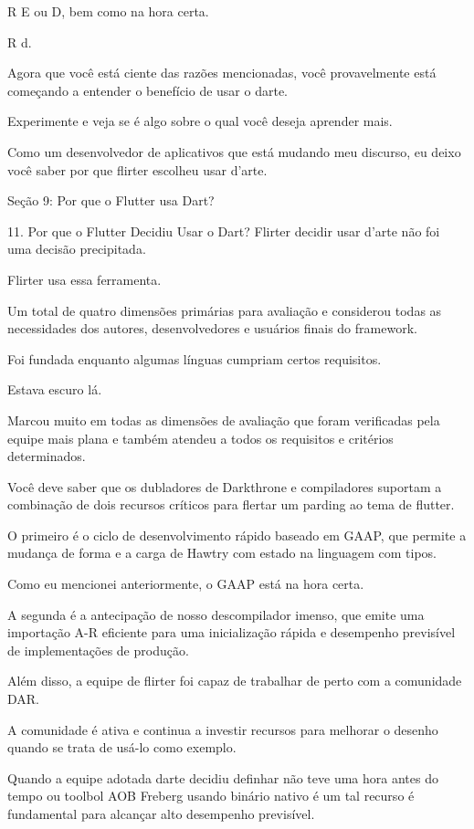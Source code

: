 R E ou D, bem como na hora certa.

R d.

Agora que você está ciente das razões mencionadas, você provavelmente está começando a entender o benefício de usar o darte.

Experimente e veja se é algo sobre o qual você deseja aprender mais.

Como um desenvolvedor de aplicativos que está mudando meu discurso, eu deixo você saber por que flirter escolheu usar d'arte.

Seção 9: Por que o Flutter usa Dart?

11. Por que o Flutter Decidiu Usar o Dart?
Flirter decidir usar d'arte não foi uma decisão precipitada.

Flirter usa essa ferramenta.

Um total de quatro dimensões primárias para avaliação e considerou todas as necessidades dos autores, desenvolvedores e usuários finais do framework.

Foi fundada enquanto algumas línguas cumpriam certos requisitos.

Estava escuro lá.

Marcou muito em todas as dimensões de avaliação que foram verificadas pela equipe mais plana e também atendeu a todos os requisitos e critérios determinados.

Você deve saber que os dubladores de Darkthrone e compiladores suportam a combinação de dois recursos críticos para flertar um parding ao tema de flutter.

O primeiro é o ciclo de desenvolvimento rápido baseado em GAAP, que permite a mudança de forma e a carga de Hawtry com estado na linguagem com tipos.

Como eu mencionei anteriormente, o GAAP está na hora certa.

A segunda é a antecipação de nosso descompilador imenso, que emite uma importação A-R eficiente para uma inicialização rápida e desempenho previsível de implementações de produção.

Além disso, a equipe de flirter foi capaz de trabalhar de perto com a comunidade DAR.

A comunidade é ativa e continua a investir recursos para melhorar o desenho quando se trata de usá-lo como exemplo.

Quando a equipe adotada darte decidiu definhar não teve uma hora antes do tempo ou toolbol AOB Freberg usando binário nativo é um tal recurso é fundamental para alcançar alto desempenho previsível.

